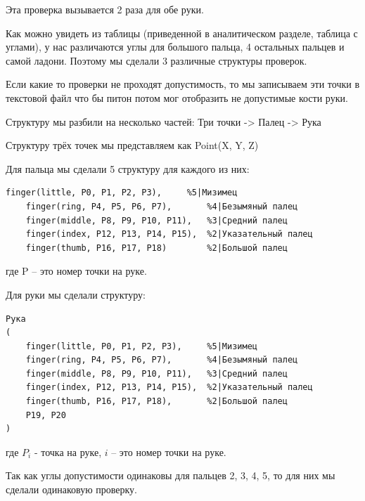 \hspace{0.6cm}Эта проверка вызывается 2 раза для обе руки.

\hspace{0.6cm} Как можно увидеть из таблицы (приведенной в аналитическом разделе, таблица с углами), у нас различаются углы для большого пальца, 4 остальных пальцев и самой ладони. Поэтому мы сделали 3 различные структуры проверок.

\hspace{0.6cm} Если какие то проверки не проходят допустимость, то мы записываем эти точки в текстовой файл что бы питон потом мог отобразить не допустимые кости руки.

\hspace{0.6cm} Структуру мы разбили на несколько частей: Три точки -> Палец -> Рука

\hspace{0.6cm} Структуру трёх точек мы представляем как Point(X, Y, Z)

\hspace{0.6cm} Для пальца мы сделали 5 структуру для каждого из них:
	
\begin{lstlisting}[caption=Листинг структур пальцев, label=struct:finger]
	finger(little, P0, P1, P2, P3),		%5|Мизимец
	finger(ring, P4, P5, P6, P7),		%4|Безымяный палец
	finger(middle, P8, P9, P10, P11),	%3|Средний палец
	finger(index, P12, P13, P14, P15),	%2|Указательный палец
	finger(thumb, P16, P17, P18)		%2|Большой палец
\end{lstlisting}
\hspace{0.6cm} где P – это номер точки на руке.

\hspace{0.6cm} Для руки мы сделали структуру:
\begin{lstlisting}[caption=Листинг структуры руки, label=struct:hand]
Рука
(
	finger(little, P0, P1, P2, P3),		%5|Мизимец
	finger(ring, P4, P5, P6, P7),		%4|Безымяный палец
	finger(middle, P8, P9, P10, P11),	%3|Средний палец
	finger(index, P12, P13, P14, P15),	%2|Указательный палец
	finger(thumb, P16, P17, P18),		%2|Большой палец
	P19, P20
)
\end{lstlisting}

\hspace{0.6cm} где $P_{i}$ - точка на руке, $i$ – это номер точки на руке.

\hspace{0.6cm} Так как углы допустимости одинаковы для пальцев 2, 3, 4, 5, то для них мы сделали одинаковую проверку.

